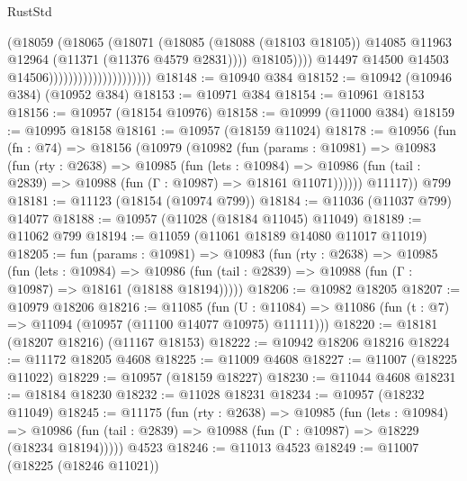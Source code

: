 \begin{lexlean}{RustStd}
\begin{coremodule}
{\begin{coremodule}
{{{{{{{{{{{{{{{{{{{{{{{{{{{{{{{{{                                                  (@18059
                                                    (@18065
                                                      (@18071
                                                        (@18085
                                                          (@18088 (@18103 @18105))
                                                          @14085
                                                          @11963
                                                          @12964
                                                          (@11371 (@11376 @4579 @2831))))
                                                      @18105))))
                                              @14497
                                              @14500
                                              @14503
                                              @14506)))))))))))))))))))))
@18148 := @10940 @384
@18152 := @10942 (@10946 @384) (@10952 @384)
@18153 := @10971 @384
@18154 := @10961 @18153
@18156 := @10957 (@18154 @10976)
@18158 := @10999 (@11000 @384)
@18159 := @10995 @18158
@18161 := @10957 (@18159 @11024)
@18178 := @10956
    (fun (fn : @74) =>
    @18156
      (@10979
        (@10982
          (fun (params : @10981) =>
          @10983
            (fun (rty : @2638) =>
            @10985
              (fun (lets : @10984) =>
              @10986 (fun (tail : @2839) => @10988 (fun (Γ : @10987) => @18161 @11071))))))
        @11117))
    @799
@18181 := @11123 (@18154 (@10974 @799))
@18184 := @11036 (@11037 @799) @14077
@18188 := @10957 (@11028 (@18184 @11045) @11049)
@18189 := @11062 @799
@18194 := @11059 (@11061 @18189 @14080 @11017 @11019)
@18205 := fun (params : @10981) =>
  @10983
    (fun (rty : @2638) =>
    @10985
      (fun (lets : @10984) =>
      @10986 (fun (tail : @2839) => @10988 (fun (Γ : @10987) => @18161 (@18188 @18194)))))
@18206 := @10982 @18205
@18207 := @10979 @18206
@18216 := @11085
    (fun (U : @11084) => @11086 (fun (t : @7) => @11094 (@10957 (@11100 @14077 @10975) @11111)))
@18220 := @18181 (@18207 @18216) (@11167 @18153)
@18222 := @10942 @18206 @18216
@18224 := @11172 @18205 @4608
@18225 := @11009 @4608
@18227 := @11007 (@18225 @11022)
@18229 := @10957 (@18159 @18227)
@18230 := @11044 @4608
@18231 := @18184 @18230
@18232 := @11028 @18231
@18234 := @10957 (@18232 @11049)
@18245 := @11175
    (fun (rty : @2638) =>
    @10985
      (fun (lets : @10984) =>
      @10986 (fun (tail : @2839) => @10988 (fun (Γ : @10987) => @18229 (@18234 @18194)))))
    @4523
@18246 := @11013 @4523
@18249 := @11007 (@18225 (@18246 @11021))
}}}}}}}}}}}}}}}}}}}}}}}}}}}}}}}}}
\end{coremodule}}
\end{coremodule}
\end{lexlean}

